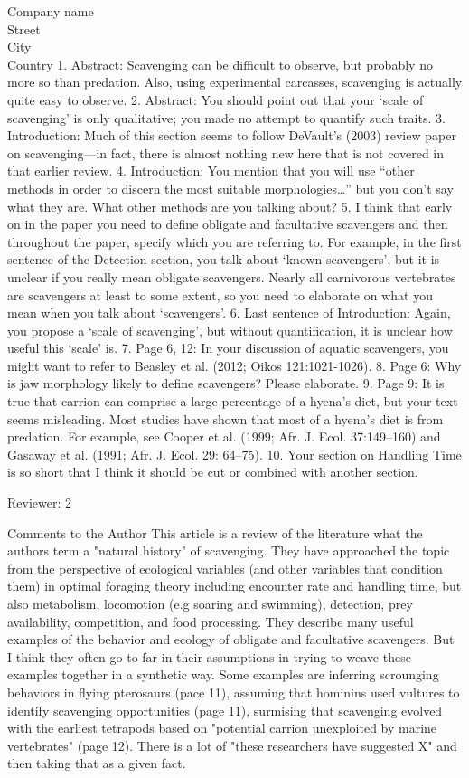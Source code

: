 \documentclass{letter}
\begin{document}
\begin{letter}{Company name \\ Street\\ City\\ Country}
1.      Abstract:  Scavenging can be difficult to observe, but probably no more so than predation.  Also, using experimental carcasses, scavenging is actually quite easy to observe.
2.      Abstract:  You should point out that your ‘scale of scavenging’ is only qualitative; you made no attempt to quantify such traits.
3.      Introduction:  Much of this section seems to follow DeVault’s (2003) review paper on scavenging—in fact, there is almost nothing new here that is not covered in that earlier review.
4.      Introduction:  You mention that you will use “other methods in order to discern the most suitable morphologies…”  but you don’t say what they are.  What other methods are you talking about?
5.      I think that early on in the paper you need to define obligate and facultative scavengers and then throughout the paper, specify which you are referring to.  For example, in the first sentence of the Detection section, you talk about ‘known scavengers’, but it is unclear if you really mean obligate scavengers.  Nearly all carnivorous vertebrates are scavengers at least to some extent, so you need to elaborate on what you mean when you talk about ‘scavengers’.
6.      Last sentence of Introduction:  Again, you propose a ‘scale of scavenging’, but without quantification, it is unclear how useful this ‘scale’ is.
7.      Page 6, 12:  In your discussion of aquatic scavengers, you might want to refer to Beasley et al. (2012; Oikos 121:1021-1026).
8.      Page 6:  Why is jaw morphology likely to define scavengers?  Please elaborate.
9.      Page 9:  It is true that carrion can comprise a large percentage of a hyena’s diet, but your text seems misleading.  Most studies have shown that most of a hyena’s diet is from predation.  For example, see Cooper et al. (1999; Afr. J. Ecol. 37:149–160) and Gasaway et al. (1991; Afr. J. Ecol. 29: 64–75).
10.     Your section on Handling Time is so short that I think it should be cut or combined with another section.


Reviewer: 2

Comments to the Author
This article is a review of the literature what the authors term a "natural history" of scavenging. They have approached the topic from the perspective of ecological variables (and other variables that condition them) in optimal foraging theory including encounter rate and handling time, but also metabolism, locomotion (e.g soaring and swimming), detection, prey availability, competition, and food processing. They describe many useful examples of the behavior and ecology of obligate and facultative scavengers. But I think they often go to far in their assumptions in trying to weave these examples together in a synthetic way. Some examples are inferring scrounging behaviors in flying pterosaurs (pace 11), assuming that hominins used vultures to identify scavenging opportunities (page 11), surmising that scavenging evolved with the earliest tetrapods based on "potential carrion unexploited by marine vertebrates" (page 12). There is a lot of "these researchers have suggested X" and then taking that as a given fact.


\end{letter}
\end{document}
